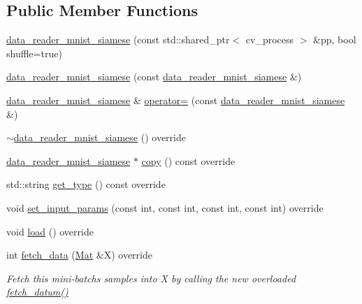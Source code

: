 \subsection*{Public Member Functions}
\begin{DoxyCompactItemize}
\item 
\hyperlink{classlbann_1_1data__reader__mnist__siamese_af10a15ece71ae9c20069161a1c83abcd}{data\+\_\+reader\+\_\+mnist\+\_\+siamese} (const std\+::shared\+\_\+ptr$<$ cv\+\_\+process $>$ \&pp, bool shuffle=true)
\item 
\hyperlink{classlbann_1_1data__reader__mnist__siamese_ac68ac9d831b8ac2209069fb4d407060a}{data\+\_\+reader\+\_\+mnist\+\_\+siamese} (const \hyperlink{classlbann_1_1data__reader__mnist__siamese}{data\+\_\+reader\+\_\+mnist\+\_\+siamese} \&)
\item 
\hyperlink{classlbann_1_1data__reader__mnist__siamese}{data\+\_\+reader\+\_\+mnist\+\_\+siamese} \& \hyperlink{classlbann_1_1data__reader__mnist__siamese_ad41517c9c789bbf8d7e0696832e52d98}{operator=} (const \hyperlink{classlbann_1_1data__reader__mnist__siamese}{data\+\_\+reader\+\_\+mnist\+\_\+siamese} \&)
\item 
\hyperlink{classlbann_1_1data__reader__mnist__siamese_a308c0ac052f218a52da40043164fab1b}{$\sim$data\+\_\+reader\+\_\+mnist\+\_\+siamese} () override
\item 
\hyperlink{classlbann_1_1data__reader__mnist__siamese}{data\+\_\+reader\+\_\+mnist\+\_\+siamese} $\ast$ \hyperlink{classlbann_1_1data__reader__mnist__siamese_a0b9750c72f9fdb28499b6dfe70bc9a6f}{copy} () const override
\item 
std\+::string \hyperlink{classlbann_1_1data__reader__mnist__siamese_a2c5a29603f850bb0684dba1c64981604}{get\+\_\+type} () const override
\item 
void \hyperlink{classlbann_1_1data__reader__mnist__siamese_abe572754f0b1415407c1b698b0f83656}{set\+\_\+input\+\_\+params} (const int, const int, const int, const int) override
\item 
void \hyperlink{classlbann_1_1data__reader__mnist__siamese_a2c60a89c5815fa24b34d4febfecfc3db}{load} () override
\item 
int \hyperlink{classlbann_1_1data__reader__mnist__siamese_ac44a7118e94338e14f7b6a9e33239155}{fetch\+\_\+data} (\hyperlink{base_8hpp_a68f11fdc31b62516cb310831bbe54d73}{Mat} \&X) override
\begin{DoxyCompactList}\small\item\em Fetch this mini-\/batch\textquotesingle{}s samples into X by calling the new overloaded \hyperlink{classlbann_1_1data__reader__mnist__siamese_a299dd32be165c5acf320b6f40404cb17}{fetch\+\_\+datum()} \end{DoxyCompactList}\item 

\end{DoxyCompactItemize}
